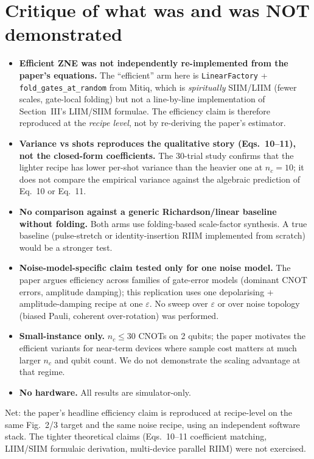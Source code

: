 \documentclass[11pt]{article}
\begin{document}
\section{Critique of what was and was NOT demonstrated}
\begin{itemize}
\item \textbf{Efficient ZNE was not independently re-implemented from the
paper's equations.} The ``efficient'' arm here is
\texttt{LinearFactory} + \texttt{fold\_gates\_at\_random} from Mitiq,
which is \emph{spiritually} SIIM/LIIM (fewer scales, gate-local folding)
but not a line-by-line implementation of Section~III's LIIM/SIIM
formulae. The efficiency claim is therefore reproduced at the
\emph{recipe level}, not by re-deriving the paper's estimator.
\item \textbf{Variance vs shots reproduces the qualitative story
(Eqs.~10--11), not the closed-form coefficients.} The 30-trial study
confirms that the lighter recipe has lower per-shot variance than the
heavier one at $n_c{=}10$; it does not compare the empirical variance
against the algebraic prediction of Eq.~10 or Eq.~11.
\item \textbf{No comparison against a generic Richardson/linear baseline
without folding.} Both arms use folding-based scale-factor synthesis.
A true baseline (pulse-stretch or identity-insertion RIIM implemented
from scratch) would be a stronger test.
\item \textbf{Noise-model-specific claim tested only for one noise model.}
The paper argues efficiency across families of gate-error models
(dominant CNOT errors, amplitude damping); this replication uses one
depolarising + amplitude-damping recipe at one $\varepsilon$. No sweep
over $\varepsilon$ or over noise topology (biased Pauli, coherent
over-rotation) was performed.
\item \textbf{Small-instance only.} $n_c \le 30$ CNOTs on 2 qubits; the
paper motivates the efficient variants for near-term devices where
sample cost matters at much larger $n_c$ and qubit count. We do not
demonstrate the scaling advantage at that regime.
\item \textbf{No hardware.} All results are simulator-only.
\end{itemize}
Net: the paper's headline efficiency claim is reproduced at recipe-level on the
same Fig.~2/3 target and the same noise recipe, using an independent software
stack. The tighter theoretical claims (Eqs.~10--11 coefficient matching,
LIIM/SIIM formulaic derivation, multi-device parallel RIIM) were not exercised.


\end{document}

